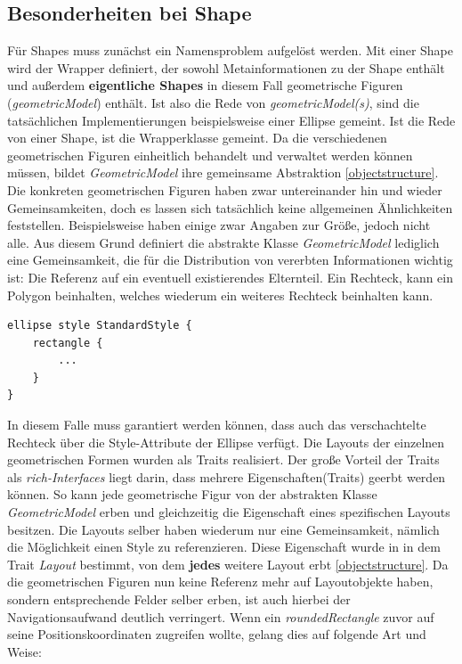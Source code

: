 \subsection{Besonderheiten bei Shape}
Für Shapes muss zunächst ein Namensproblem aufgelöst werden. Mit einer Shape wird der Wrapper definiert, der sowohl Metainformationen zu der Shape enthält und außerdem \textbf{eigentliche Shapes} in diesem Fall geometrische Figuren (\textit{geometricModel}) enthält. Ist also die Rede von \textit{geometricModel(s)}, sind die tatsächlichen Implementierungen beispielsweise einer Ellipse gemeint. Ist die Rede von einer Shape, ist die Wrapperklasse gemeint. Da die verschiedenen geometrischen Figuren einheitlich behandelt und verwaltet werden können müssen, bildet \textit{GeometricModel} ihre gemeinsame Abstraktion \ref{objectstructure}. Die konkreten geometrischen Figuren haben zwar untereinander hin und wieder Gemeinsamkeiten, doch es lassen sich tatsächlich keine allgemeinen Ähnlichkeiten feststellen. Beispielsweise haben einige zwar Angaben zur Größe, jedoch nicht alle. Aus diesem Grund definiert die abstrakte Klasse \textit{GeometricModel} lediglich eine Gemeinsamkeit, die für die Distribution von vererbten Informationen wichtig ist: Die Referenz auf ein eventuell existierendes Elternteil. Ein Rechteck, kann ein Polygon beinhalten, welches wiederum ein weiteres Rechteck beinhalten kann.
\begin{lstlisting}[style=spray]
ellipse style StandardStyle {
    rectangle {
        ...
    }
}
\end{lstlisting}
In diesem Falle muss garantiert werden können, dass auch das verschachtelte Rechteck über die Style-Attribute der Ellipse verfügt.
Die Layouts der einzelnen geometrischen Formen wurden als Traits realisiert. Der große Vorteil der Traits als \textit{rich-Interfaces} liegt darin, dass mehrere Eigenschaften(Traits) geerbt werden können. So kann jede geometrische Figur von der abstrakten Klasse \textit{GeometricModel} erben und gleichzeitig die Eigenschaft eines spezifischen Layouts besitzen.
Die Layouts selber haben wiederum nur eine Gemeinsamkeit, nämlich die Möglichkeit einen Style zu referenzieren. Diese Eigenschaft wurde in in dem Trait \textit{Layout} bestimmt, von dem \textbf{jedes} weitere Layout erbt \ref{objectstructure}. Da die geometrischen Figuren nun keine Referenz mehr auf Layoutobjekte haben, sondern entsprechende Felder selber erben, ist auch hierbei der Navigationsaufwand deutlich verringert. Wenn ein \textit{roundedRectangle} zuvor auf seine Positionskoordinaten zugreifen wollte, gelang dies auf folgende Art und Weise:
